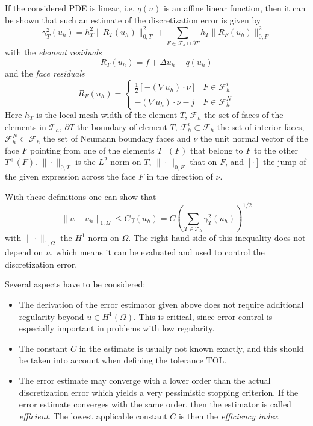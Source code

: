 \documentclass[a4paper,12pt]{article}
\begin{document}
If the considered PDE is linear, i.e. $q(u)$ is an affine linear function, then it can be shown 
\cite{Eriksson,AinsworthOden}
that such an estimate of the discretization error is given by
\begin{equation*}
  \gamma_T^2(u_h) = h_T^2 \| R_T(u_h) \|_{0,T}^2 + \sum_{F \in \mathcal{F}_h \cap \partial T} h_T \| R_F(u_h) \|_{0,F}^2
\end{equation*}
with the \emph{element residuals}
\begin{equation*}
  R_T(u_h) = f + \Delta u_h - q(u_h)
\end{equation*}
and the \emph{face residuals}
\begin{equation*}
  R_F(u_h) = \begin{cases} \frac{1}{2} [-(\nabla u_h) \cdot \nu] & F \in \mathcal{F}_h^i \\ - (\nabla u_h) \cdot \nu - j & F \in \mathcal{F}_h^N \end{cases}
\end{equation*}
Here $h_T$ is the local mesh width of the element $T$, $\mathcal{F}_h$ the set of faces of the elements
in $\mathcal{T}_h$, $\partial T$ the boundary of element $T$, $\mathcal{F}_h^i \subset \mathcal{F}_h$
the set of interior faces, $\mathcal{F}_h^N \subset \mathcal{F}_h$ the set of Neumann boundary faces and
$\nu$ the unit normal vector of the face $F$ pointing from one of the elements $T^-(F)$ that belong to
$F$ to the other $T^+(F)$. $\|\cdot\|_{0,T}$ is the $L^2$ norm on $T$, $\|\cdot\|_{0,F}$ that on $F$,
and $[\cdot]$ the jump of the given expression across the face $F$ in the direction of $\nu$.

With these definitions one can show that
\begin{equation*}
  \|u - u_h\|_{1,\Omega} \leq C \gamma(u_h) = C \left( \sum_{T \in {\mathcal T}_h} \gamma_T^2(u_h) \right)^{1/2}
\end{equation*}
with $\|\cdot\|_{1,\Omega}$ the $H^1$ norm on $\Omega$. The right hand side of this inequality does not
depend on $u$, which means it can be evaluated and used to control the discretization error.

Several aspects have to be considered:
\begin{itemize}
  \item The derivation of the error estimator given above does not require additional regularity
    beyond $u \in H^1(\Omega)$. This is critical, since error control is especially important
    in problems with low regularity.
  \item The constant $C$ in the estimate is usually not known exactly, and this should be taken
    into account when defining the tolerance $\text{TOL}$.
  \item The error estimate may converge with a lower order than the actual discretization error
    which yields a very pessimistic stopping criterion. If the error estimate converges with the
    same order, then the estimator is called \emph{efficient}. The lowest applicable constant $C$
    is then the \emph{efficiency index}.
\end{itemize}
\end{document}
